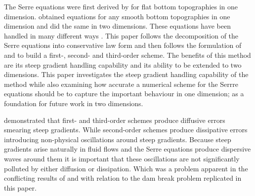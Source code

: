 \documentclass[SingleSpace,12pt]{Serre_ASCE}
\begin{document}
The Serre equations were first derived by  for flat bottom topographies in one dimension.  obtained equations for any smooth bottom topographies in one dimension and  did the same in two dimensions. These equations have been handled in many different ways \cite{Dutykh-2014-315,Bonneton-etal-2011-1479,Antunes-do-Carmo-etal-1993-725,Chazel-etal-2011-105,Barthelemy-2006-51-1217,Barthelemy-2007-53-1423,Clamond-2011-315}. This paper follows the decomposition of the Serre equations into conservative law form \cite{Hank-etal-2010-2034,Guyenne-etal-2014-169} and then follows the formulation of  and  to build a first-, second- and third-order scheme. The benefits of this method are its steep gradient handling capability and its ability to be extended to two dimensions. This paper investigates the steep gradient handling capability of the method while also examining how accurate a numerical scheme for the Serrre equations should be to capture the important behaviour in one dimension; as a foundation for future work in two dimensions. 

 demonstrated that first- and third-order schemes produce diffusive errors smearing steep gradients. While second-order schemes produce dissipative errors introducing non-physical oscillations around steep gradients. Because steep gradients arise naturally in fluid flows and the Serre equations produce dispersive waves around them \cite{El-etal-2006} it is important that these oscillations are not significantly polluted by either diffusion or dissipation. Which was a problem apparent in the conflicting results of  and  with relation to the dam break problem replicated in this paper. 

\end{document}
